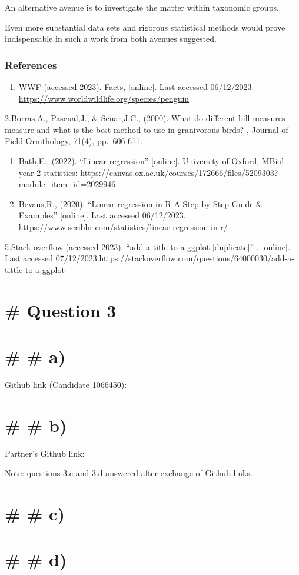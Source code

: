 \documentclass[
]{article}
\providecommand{\tightlist}{%
  \setlength{\itemsep}{0pt}\setlength{\parskip}{0pt}}
\begin{document}
An alternative avenue is to investigate the matter within taxonomic
groups.

Even more substantial data sets and rigorous statistical methods would
prove indispensable in such a work from both avenues suggested.

\hypertarget{references}{%
\subsubsection{References}\label{references}}

\begin{enumerate}
\def\labelenumi{\arabic{enumi}.}
\tightlist
\item
  WWF (accessed 2023). Facts, {[}online{]}. Last accessed 06/12/2023.
  \url{https://www.worldwildlife.org/species/penguin}
\end{enumerate}

2.Borras,A., Pascual,J., \& Senar,J.C., (2000). What do different bill
measures measure and what is the best method to use in granivorous
birds? , Journal of Field Ornithology, 71(4), pp.~606-611.

\begin{enumerate}
\def\labelenumi{\arabic{enumi}.}
\setcounter{enumi}{2}
\item
  Bath,E., (2022). ``Linear regression'' {[}online{]}. University of
  Oxford, MBiol year 2 statistics:
  \url{https://canvas.ox.ac.uk/courses/172666/files/5209303?module_item_id=2029946}
\item
  Bevans,R., (2020). ``Linear regression in R A Step-by-Step Guide \&
  Examples'' {[}online{]}. Last accessed 06/12/2023.
  \url{https://www.scribbr.com/statistics/linear-regression-in-r/}
\end{enumerate}

5.Stack overflow (accessed 2023). ``add a title to a ggplot
{[}duplicate{]}'' . {[}online{]}. Last accessed
07/12/2023.https://stackoverflow.com/questions/64000030/add-a-tittle-to-a-ggplot

\hypertarget{question-3}{%
\section{\# Question 3}\label{question-3}}

\hypertarget{a}{%
\section{\# \# a)}\label{a}}

Github link (Candidate 1066450):

\hypertarget{b}{%
\section{\# \# b)}\label{b}}

Partner's Github link:

Note: questions 3.c and 3.d answered after exchange of Github links.

\hypertarget{c}{%
\section{\# \# c)}\label{c}}

\hypertarget{d}{%
\section{\# \# d)}\label{d}}
\end{document}
